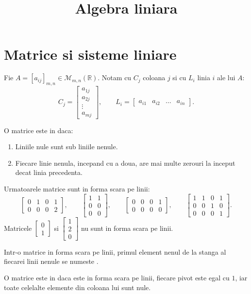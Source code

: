 \documentclass{article}
\title{Algebra liniara}
\author{}
\date{}
\begin{document}
\maketitle

\newcommand{\colvec}[1]{\begin{bmatrix}#1\end{bmatrix}}

\section{Matrice si sisteme liniare}
\begin{enumerate}

  \notatie Fie $A = [a_{ij}]_{m,n} \in \mathcal{M}_{m,n}(\mathbb{R})$. Notam cu $C_j$ coloana $j$ si cu $L_i$ linia $i$ ale lui $A$:
  \[
    C_j = \colvec{a_{1j} \\ a_{2j} \\ \vdots \\ a_{mj}},
    \qquad L_i = \colvec{a_{i1} & a_{i2} & \dots & a_{in}}.
  \]

   O matrice este in  daca:
  \begin{enumerate}
    \item Liniile nule sunt sub liniile nenule.
    \item Fiecare linie nenula, incepand cu a doua, are mai multe zerouri la inceput decat linia precedenta.
  \end{enumerate}

  \exemplu Urmatoarele matrice sunt in forma scara pe linii:
  \[
    \colvec{0 & 1 & 0 & 1 \\ 0 & 0 & 0 & 2}, \qquad
    \colvec{1 & 1 \\ 0 & 0 \\ 0 & 0}, \qquad
    \colvec{0 & 0 & 0 & 1 \\ 0 & 0 & 0 & 0}, \qquad
    \colvec{1 & 1 & 0 & 1 \\ 0 & 0 & 1 & 0 \\ 0 & 0 & 0 & 1}.
  \]
  Matricele $\colvec{0 \\ 1}$ si $\colvec{1 \\ 2 \\ 0}$ nu sunt in forma scara pe linii.

   Intr-o matrice in forma scara pe linii, primul element nenul de la stanga al fiecarei linii nenule se numeste .

   O matrice este in  daca este in forma scara pe linii, fiecare pivot este egal cu $1$, iar toate celelalte elemente din coloana lui sunt nule.


\end{enumerate}
\end{document}
